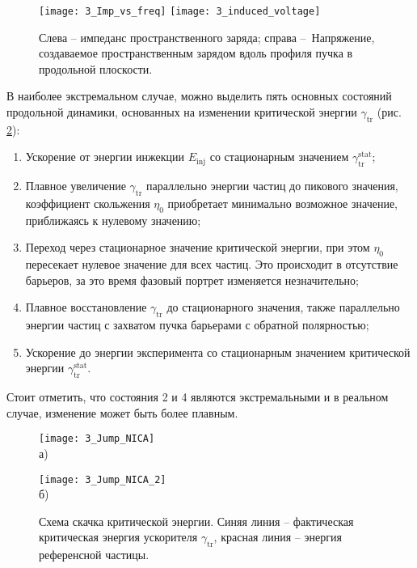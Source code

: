 \begin{figure}[!h]
   \texttt{[image: 3\_Imp\_vs\_freq]}
   \texttt{[image: 3\_induced\_voltage]}
   \caption{Слева – импеданс пространственного заряда; справа – Напряжение, создаваемое пространственным 
   зарядом вдоль профиля пучка в продольной плоскости. }
   \label{fig:signal}
\end{figure}

В наиболее экстремальном случае, можно выделить пять основных состояний продольной динамики, основанных на изменении критической энергии
$\gamma_{\textrm{tr}}$ (рис. \ref{fig:jump_NICA}):

\begin{enumerate} 
  \item Ускорение от энергии инжекции $E_{\textrm{inj}}$ со стационарным значением $\gamma_{\textrm{tr}}^{\textrm{stat}}$;
  \item  Плавное увеличение $\gamma_{\textrm{tr}}$ параллельно энергии частиц до пикового значения, коэффициент скольжения $\eta_0$ приобретает минимально возможное значение, приближаясь к нулевому значению;
  \item Переход через стационарное значение критической энергии, при этом $\eta_0$ пересекает нулевое значение для всех частиц. Это происходит в отсутствие барьеров, за это время фазовый портрет изменяется незначительно;
  \item Плавное восстановление $\gamma_{\textrm{tr}}$ до стационарного значения, также па\-рал\-лель\-но энергии частиц с захватом пучка барьерами с обратной полярностью;
  \item Ускорение до энергии эксперимента со стационарным значением критической энергии $\gamma_{\textrm{tr}}^{\textrm{stat}}$.
\end{enumerate}

\noindent Стоит отметить, что состояния 2 и 4 являются экстремальными и в реальном случае, изменение может быть более плавным.

\begin{figure}[!h]
    \begin{minipage}[b][][b]{0.49\linewidth}\centering
        \texttt{[image: 3\_Jump\_NICA]} \\ а)
    \end{minipage}
    \hfill
    \begin{minipage}[b][][b]{0.49\linewidth}\centering
        \texttt{[image: 3\_Jump\_NICA\_2]} \\ б)
    \end{minipage}
    \caption{Схема скачка критической энергии. Синяя линия – фактическая критическая энергия ускорителя $\gamma_{\textrm{tr}}$, красная линия – энергия референсной частицы.}
    \label{fig:jump_NICA}
\end{figure}

